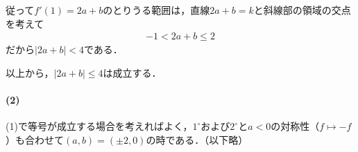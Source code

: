 \documentclass[../../main.tex]{subfiles}
\begin{document}
従って$f'(1)=2a+b$のとりうる範囲は，直線$2a+b=k$と斜線部の領域の交点を考えて
\begin{align}
  -1<2a+b\le2
\end{align}
だから$|2a+b|<4$である．
\casesend

以上から，$|2a+b|\le4$は成立する．

\paragraph{(2)}
(1)で等号が成立する場合を考えればよく，$1^{\circ}$および$2^{\circ}$と$a<0$の対称性（$f \mapsto -f$）も合わせて$(a,b)=(\pm 2,0)$の時である．（以下略）

\newpage
\end{document}
